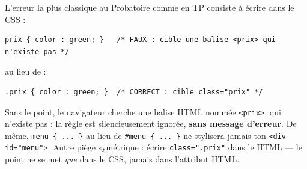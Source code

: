 \documentclass[11pt]{article}
\begin{document}
\begin{attention}
L'erreur la plus classique au Probatoire comme en TP consiste à écrire dans le CSS :
\begin{lstlisting}
prix { color : green; }   /* FAUX : cible une balise <prix> qui n'existe pas */
\end{lstlisting}
au lieu de :
\begin{lstlisting}
.prix { color : green; }  /* CORRECT : cible class="prix" */
\end{lstlisting}
Sans le point, le navigateur cherche une balise HTML nommée \texttt{<prix>}, qui n'existe pas : la règle est silencieusement ignorée, \textbf{sans message d'erreur}. De même, \texttt{menu \{ ... \}} au lieu de \texttt{\#menu \{ ... \}} ne stylisera jamais ton \texttt{<div id="menu">}. Autre piège symétrique : écrire \texttt{class=".prix"} dans le HTML — le point ne se met \emph{que} dans le CSS, jamais dans l'attribut HTML.
\end{attention}
\end{document}
